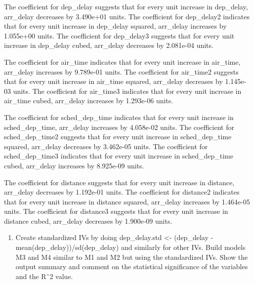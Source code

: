 \documentclass[
]{article}
\providecommand{\tightlist}{%
  \setlength{\itemsep}{0pt}\setlength{\parskip}{0pt}}
\begin{document}
The coefficient for dep\_delay suggests that for every unit increase in
dep\_delay, arr\_delay decreases by 3.490e+01 units. The coefficient for
dep\_delay2 indicates that for every unit increase in dep\_delay
squared, arr\_delay increases by 1.055e+00 units. The coefficient for
dep\_delay3 suggests that for every unit increase in dep\_delay cubed,
arr\_delay decreases by 2.081e-04 units.

The coefficient for air\_time indicates that for every unit increase in
air\_time, arr\_delay increases by 9.789e-01 units. The coefficient for
air\_time2 suggests that for every unit increase in air\_time squared,
arr\_delay decreases by 1.145e-03 units. The coefficient for air\_time3
indicates that for every unit increase in air\_time cubed, arr\_delay
increases by 1.293e-06 units.

The coefficient for sched\_dep\_time indicates that for every unit
increase in sched\_dep\_time, arr\_delay increases by 4.058e-02 units.
The coefficient for sched\_dep\_time2 suggests that for every unit
increase in sched\_dep\_time squared, arr\_delay decreases by 3.462e-05
units. The coefficient for sched\_dep\_time3 indicates that for every
unit increase in sched\_dep\_time cubed, arr\_delay increases by
8.925e-09 units.

The coefficient for distance suggests that for every unit increase in
distance, arr\_delay decreases by 1.192e-01 units. The coefficient for
distance2 indicates that for every unit increase in distance squared,
arr\_delay increases by 1.464e-05 units. The coefficient for distance3
suggests that for every unit increase in distance cubed, arr\_delay
decreases by 1.900e-09 units.

\begin{enumerate}
\def\labelenumi{\alph{enumi}.}
\setcounter{enumi}{4}
\tightlist
\item
  Create standardized IVs by doing dep\_delay.std \textless- (dep\_delay
  - mean(dep\_delay))/sd(dep\_delay) and similarly for other IVs. Build
  models M3 and M4 similar to M1 and M2 but using the standardized IVs.
  Show the output summary and comment on the statistical significance of
  the variables and the Rˆ2 value.
\end{enumerate}
\end{document}
